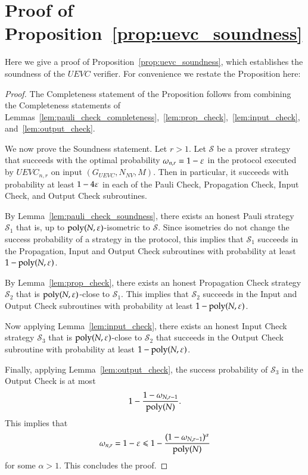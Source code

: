 \section{Proof of Proposition~\ref{prop:uevc_soundness}}
\label{sec:soundness}

Here we give a proof of Proposition~\ref{prop:uevc_soundness}, which establishes the soundness of the $UEVC$ verifier. For convenience we restate the Proposition here:

\soundness*

\begin{proof}
	
	The Completeness statement of the Proposition follows from combining the Completeness statements of Lemmas~\ref{lem:pauli_check_completeness},~\ref{lem:prop_check},~\ref{lem:input_check}, and~\ref{lem:output_check}.
	
	We now prove the Soundness statement. Let $r > 1$. Let $\mathcal{S}$ be a prover strategy that succeeds with the optimal probability $\omega_{n,r} = 1 - \varepsilon$ in the protocol executed by $UEVC_{n,r}$ on input $(G_{UEVC},N_{NV},M)$. Then in particular, it succeeds with probability at least $1 - 4\varepsilon$ in each of the Pauli Check, Propagation Check, Input Check, and Output Check subroutines. 
	
	By Lemma~\ref{lem:pauli_check_soundness}, there exists an honest Pauli strategy $\mathcal{S}_1$ that is, up to $\operatorname{poly}(N,\varepsilon)$-isometric to $\mathcal{S}$. Since isometries do not change the success probability of a strategy in the protocol, this implies that $\mathcal{S}_1$ succeeds in the Propagation, Input and Output Check subroutines with probability at least $1 - \operatorname{poly}(N,\varepsilon)$. 
	
	By Lemma~\ref{lem:prop_check}, there exists an honest Propagation Check strategy $\mathcal{S}_2$ that is $\operatorname{poly}(N,\varepsilon)$-close to $\mathcal{S}_1$. This implies that $\mathcal{S}_2$ succeeds in the Input and Output Check subroutines with probability at least $1 - \operatorname{poly}(N,\varepsilon)$. 
	
	Now applying Lemma~\ref{lem:input_check}, there exists an honest Input Check strategy $\mathcal{S}_3$ that is $\operatorname{poly}(N,\varepsilon)$-close to $\mathcal{S}_2$ that succeeds in the Output Check subroutine with probability at least $1 - \operatorname{poly}(N,\varepsilon)$.
	
	Finally, applying Lemma~\ref{lem:output_check}, the success probability of $\mathcal{S}_3$ in the Output Check is at most 
	\[
		1 - \frac{1 - \omega_{N,r-1}}{\operatorname{poly}(N)}.
	\]
	This implies that
	\[
		\omega_{n,r} = 1 - \varepsilon \leqslant 1 - \frac{(1 - \omega_{N,r-1})^\alpha}{\operatorname{poly}(N)}
	\]
	for some $\alpha > 1$. 
	This concludes the proof.
\end{proof}
